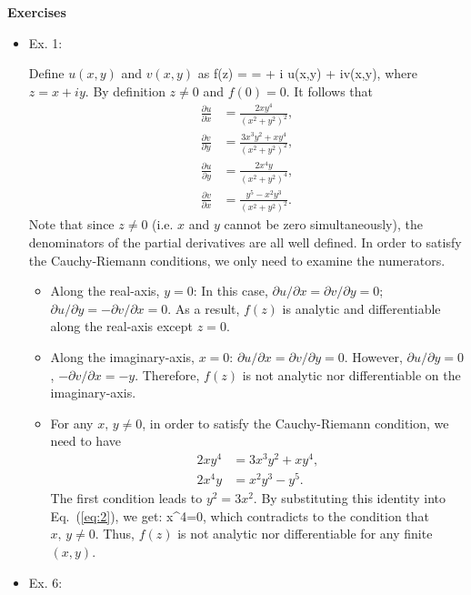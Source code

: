 \documentclass[10pt, letterpaper]{article}
\begin{document}
\noindent
{\bf Exercises}
\begin{itemize}
	\item Ex. 1: 

	Define $u(x,y)$ and $v(x,y)$ as
	\be
		f(z) =  =  + i \equiv u(x,y) + iv(x,y),
	\ee
	where $z=x+iy$. By definition $z\neq 0$ and $f(0)=0$. It follows that
	\begin{align}
		\frac{\partial u}{\partial x} &= \frac{2xy^4}{(x^2+y^2)^2}, \nonumber\\
		\frac{\partial v}{\partial y} &= \frac{3x^3y^2+xy^4}{(x^2+y^2)^2}, \nonumber\\
		\frac{\partial u}{\partial y} &= \frac{2x^4y}{(x^2+y^2)^4}, \nonumber\\
		\frac{\partial v}{\partial x} &= \frac{y^5 - x^2y^3}{(x^2+y^2)^2}. \nonumber
	\end{align}
	Note that since $z\neq 0$ (i.e. $x$ and $y$ cannot be zero simultaneously), the denominators of the partial
	derivatives are all well defined. In order to satisfy the Cauchy-Riemann conditions, we only need to examine
	the numerators.
	\begin{itemize}
		\item Along the real-axis, $y=0$: In this case, $\partial u/\partial x = \partial v/\partial y=0$;
		$\partial u/\partial y = -\partial v/\partial x=0$. As a result, $f(z)$ is analytic and differentiable
		along the real-axis except $z=0$.
		\item Along the imaginary-axis, $x=0$: $\partial u/\partial x = \partial v/\partial y=0$. However,
		$\partial u/\partial y=0$, $-\partial v/\partial x = -y$. Therefore, $f(z)$ is not analytic nor differentiable
		on the imaginary-axis.
		\item For any $x, \,y\neq 0$, in order to satisfy the Cauchy-Riemann condition, we need to have
		\begin{align}
			2xy^4 &= 3x^3y^2 + xy^4, \label{eq:1}\\
			2x^4y &= x^2y^3 - y^5. \label{eq:2}
		\end{align}
		The first condition leads to $y^2 = 3x^2$. By substituting this identity into Eq.~(\ref{eq:2}), we get:
		\be
			x^4=0,
		\ee
		which contradicts to the condition that $x,\,y\neq 0$. Thus, $f(z)$ is not analytic nor differentiable
		for any finite $(x, y)$.
	\end{itemize}


	\item Ex. 6: 


\end{itemize}
\end{document}
